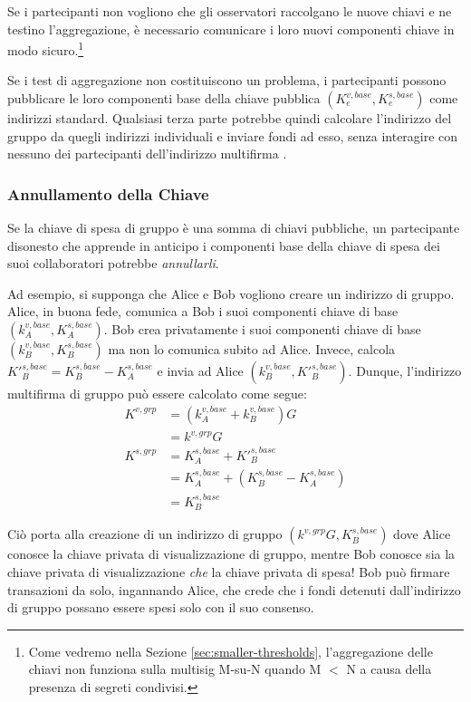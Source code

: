 Se i partecipanti non vogliono che gli osservatori raccolgano le nuove chiavi e ne testino l'aggregazione, è necessario comunicare i loro nuovi componenti chiave in modo sicuro.\footnote{Come vedremo nella Sezione \ref{sec:smaller-thresholds}, l'aggregazione delle chiavi non funziona sulla multisig M-su-N quando M $<$ N a causa della presenza di segreti condivisi.}

Se i test di aggregazione non costituiscono un problema, i partecipanti possono pubblicare le loro componenti base della chiave pubblica $(K^{v,base}_e,K^{s,base}_e)$ come indirizzi standard. Qualsiasi terza parte potrebbe quindi calcolare l'indirizzo del gruppo da quegli indirizzi individuali e inviare fondi ad esso, senza interagire con nessuno dei partecipanti dell'indirizzo multifirma \cite{maxwell2018simple-musig}.

\subsubsection*{Annullamento della Chiave}

Se la chiave di spesa di gruppo è una somma di chiavi pubbliche, un partecipante disonesto che apprende in anticipo i componenti base della chiave di spesa dei suoi collaboratori potrebbe \emph{annullarli}.

Ad esempio, si supponga che Alice e Bob vogliono creare un indirizzo di gruppo. Alice, in buona fede, comunica a Bob i suoi componenti chiave di base $(k^{v,base}_A,K^{s,base}_A)$. Bob crea privatamente i suoi componenti chiave di base $(k^{v,base}_B,K^{s,base}_B)$ ma non lo comunica subito ad Alice. Invece, calcola $K'^{s,base}_B = K^{s,base}_B - K^{s,base}_A$ e invia ad Alice $(k^{v,base}_B,K'^{s,base}_B)$. Dunque, l'indirizzo multifirma di gruppo può essere calcolato come segue:\vspace{.175cm}
\begin{align*}
    K^{v,grp} &= (k^{v,base}_A + k^{v,base}_B) G \\
             &= k^{v,grp} G\\
    K^{s,grp} &= K^{s,base}_A + K'^{s,base}_B \\
             &= K^{s,base}_A + (K^{s,base}_B - K^{s,base}_A)\\
             &= K^{s,base}_B
\end{align*}

Ciò porta alla creazione di un indirizzo di gruppo $(k^{v,grp} G,K^{s,base}_B)$ dove Alice conosce la chiave privata di visualizzazione di gruppo, mentre Bob conosce sia la chiave privata di visualizzazione \emph{che} la chiave privata di spesa! Bob può firmare transazioni da solo, ingannando Alice, che crede che i fondi detenuti dall'indirizzo di gruppo possano essere spesi solo con il suo consenso.

